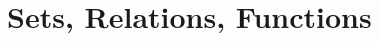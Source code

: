 \documentclass[open-logic-part]{subfiles}
\begin{document}
\part{Sets, Relations, Functions}







\OLEndPartHook
\end{document}
